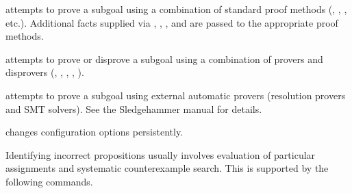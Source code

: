 \begin{isabellebody}
\begin{isamarkuptext}
\begin{description}
  \item \hyperlink{command.HOL.try-methods}{\mbox{}} attempts to prove a subgoal using a combination
    of standard proof methods (, , , etc.).
    Additional facts supplied via , ,
    , and  are passed to the appropriate proof
    methods.

  \item \hyperlink{command.HOL.try}{\mbox{}} attempts to prove or disprove a subgoal
    using a combination of provers and disprovers (,
    , , ,
    ).

  \item \hyperlink{command.HOL.sledgehammer}{\mbox{}} attempts to prove a subgoal using external
    automatic provers (resolution provers and SMT solvers). See the Sledgehammer
    manual \cite{isabelle-sledgehammer} for details.

  \item \hyperlink{command.HOL.sledgehammer-params}{\mbox{}} changes
    \hyperlink{command.HOL.sledgehammer}{\mbox{}} configuration options persistently.

  \end{description}%
\end{isamarkuptext}%
\isamarkuptrue%
%
\isamarkuptrue%
%
\begin{isamarkuptext}%
Identifying incorrect propositions usually involves evaluation of
  particular assignments and systematic counterexample search.  This
  is supported by the following commands.


\end{isamarkuptext}
\end{isabellebody}
